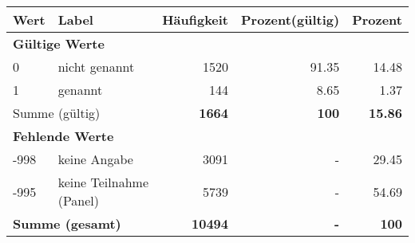      \begin{longtable}{lXrrr}
     \toprule
     \textbf{Wert} & \textbf{Label} & \textbf{Häufigkeit} & \textbf{Prozent(gültig)} & \textbf{Prozent} \\
     \endhead
     \midrule
     \multicolumn{5}{l}{\textbf{Gültige Werte}}\\

     0 &
     \multicolumn{1}{X}{ nicht genannt   } &


       \num{1520} &
       \num[round-mode=places,round-precision=2]{91.35} &
         \num[round-mode=places,round-precision=2]{14.48} \\

     1 &
     \multicolumn{1}{X}{ genannt   } &


       \num{144} &
       \num[round-mode=places,round-precision=2]{8.65} &
         \num[round-mode=places,round-precision=2]{1.37} \\
     \midrule
     \multicolumn{2}{l}{Summe (gültig)} &
       \textbf{\num{1664}} &
     \textbf{\num{100}} &
       \textbf{\num[round-mode=places,round-precision=2]{15.86}} \\
     \multicolumn{5}{l}{\textbf{Fehlende Werte}}\\
       -998 &
       keine Angabe &
         \num{3091} &
        - &
         \num[round-mode=places,round-precision=2]{29.45} \\
       -995 &
       keine Teilnahme (Panel) &
         \num{5739} &
        - &
         \num[round-mode=places,round-precision=2]{54.69} \\
     \midrule
     \multicolumn{2}{l}{\textbf{Summe (gesamt)}} &
          \textbf{\num{10494}} &
        \textbf{-} &
        \textbf{\num{100}} \\
     \bottomrule
     \end{longtable}
     
